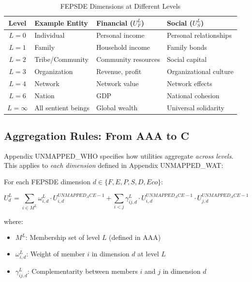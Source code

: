 \begin{table}[htbp]
\centering
\caption{FEPSDE Dimensions at Different Levels}
\label{tab:app-c-level-dimension}
\renewcommand{\arraystretch}{1.3}
\small
\begin{tabular}{@{}clll@{}}
\toprule
\textbf{Level} & \textbf{Example Entity} & \textbf{Financial ($U^L_F$)} & \textbf{Social ($U^L_S$)} \\
\midrule
$L = 0$ & Individual & Personal income & Personal relationships \\
$L = 1$ & Family & Household income & Family bonds \\
$L = 2$ & Tribe/Community & Community resources & Social capital \\
$L = 3$ & Organization & Revenue, profit & Organizational culture \\
$L = 4$ & Network & Network value & Network effects \\
$L = 6$ & Nation & GDP & National cohesion \\
$L = \infty$ & All sentient beings & Global wealth & Universal solidarity \\
\bottomrule
\end{tabular}
\end{table}

\subsection{Aggregation Rules: From AAA to C}

Appendix UNMAPPED_WHO specifies how utilities aggregate \textit{across levels}. This applies 
to \textit{each dimension} defined in Appendix UNMAPPED_WAT:

\begin{tcolorbox}[colback=green!5!white, colframe=green!75!black, 
    title=Dimension-Specific Aggregation (from AAA Axiom UNMAPPED_SRL-3)]
For each FEPSDE dimension $d \in \{F, E, P, S, D, Eco\}$:

\begin{equation}
U^L_d = \sum_{i \in M^L} \omega^L_{i,d} \cdot U^{UNMAPPED_ACE-1}_{i,d} + \sum_{i < j} \gamma^L_{ij,d} \cdot U^{UNMAPPED_ACE-1}_{i,d} \cdot U^{UNMAPPED_ACE-1}_{j,d}
\end{equation}

where:
\begin{itemize}[nosep]
\item $M^L$: Membership set of level $L$ (defined in AAA)
\item $\omega^L_{i,d}$: Weight of member $i$ in dimension $d$ at level $L$
\item $\gamma^L_{ij,d}$: Complementarity between members $i$ and $j$ in dimension $d$
\end{itemize}
\end{tcolorbox}

